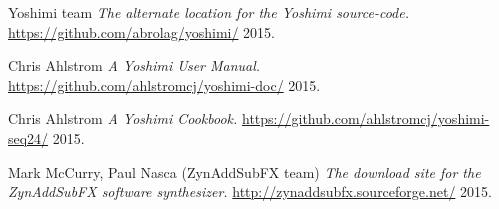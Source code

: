 \begin{thebibliography}{99}
   Yoshimi team
   \emph{The alternate location for the Yoshimi source-code.}
   \url{https://github.com/abrolag/yoshimi/}
   2015.

   Chris Ahlstrom
   \emph{A Yoshimi User Manual.}
   \url{https://github.com/ahlstromcj/yoshimi-doc/}
   2015.

   Chris Ahlstrom
   \emph{A Yoshimi Cookbook.}
   \url{https://github.com/ahlstromcj/yoshimi-seq24/}
   2015.

   Mark McCurry, Paul Nasca (ZynAddSubFX team)
   \emph{The download site for the ZynAddSubFX software synthesizer.}
   \url{http://zynaddsubfx.sourceforge.net/}
   2015.

\end{thebibliography}

